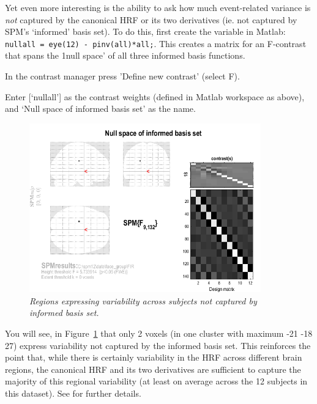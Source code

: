 Yet even more interesting is the ability to ask how much event-related variance is {\em not} captured by the canonical HRF or its two derivatives (ie. not captured by SPM's `informed' basis set). To do this, first create the variable in Matlab: \verb!nullall = eye(12) - pinv(all)*all;!.
This creates a matrix for an F-contrast that spans the 1null space' of all three informed basis functions.
\bi
\item{In the contrast manager press 'Define new contrast' (select F).}
\item{Enter [`nullall'] as the contrast weights (defined in Matlab workspace
	as above), and `Null space of informed basis set' as the name.}
\ei
\begin{figure}
\begin{center}
\includegraphics[width=100mm]{faces_group/nullall}
\caption{\em Regions expressing variability across subjects not captured by informed basis set. \label{nullall}}
\end{center}
\end{figure}
You will see, in Figure~\ref{nullall} that only 2 voxels (in one cluster with maximum -21 -18 27) express variability not captured by the informed basis set. This reinforces the point that, while there is certainly variability in the HRF across different brain regions, the canonical HRF and its two derivatives are sufficient to capture the majority of this regional variability (at least on average across the 12 subjects in this dataset). See \cite{rnah_basis} for further details.





